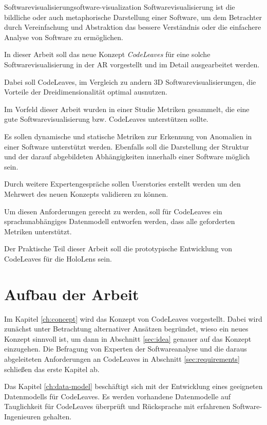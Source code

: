 \begin{defbox}{Softwarevisualisierung}{software-visualization}
Softwarevisualisierung ist die bildliche oder auch metaphorische Darstellung einer Software, um dem Betrachter durch Vereinfachung und Abstraktion das bessere Verständnis oder die einfachere Analyse von Software zu ermöglichen.
\end{defbox}

In dieser Arbeit soll das neue Konzept \emph{CodeLeaves} für eine solche Softwarevisualisierung in der AR vorgestellt und im Detail ausgearbeitet werden.

Dabei soll CodeLeaves, im Vergleich zu andern 3D Softwarevisualisierungen, die Vorteile der Dreidimensionalität optimal ausnutzen.

Im Vorfeld dieser Arbeit wurden in einer Studie Metriken gesammelt, die eine gute Softwarevisualisierung bzw. CodeLeaves unterstützen sollte.

Es sollen dynamische und statische Metriken zur Erkennung von Anomalien in einer Software unterstützt werden. Ebenfalls soll die Darstellung der Struktur und der darauf abgebildeten Abhängigkeiten innerhalb einer Software möglich sein.

Durch weitere Expertengespräche sollen Userstories erstellt werden um den Mehrwert des neuen Konzepts validieren zu können.

Um diesen Anforderungen gerecht zu werden, soll für CodeLeaves ein sprachunabhängiges Datenmodell entworfen werden, dass alle geforderten Metriken unterstützt.

Der Praktische Teil dieser Arbeit soll die prototypische Entwicklung von CodeLeaves für die HoloLens sein.

\section{Aufbau der Arbeit}
Im Kapitel \ref{ch:concept} wird das Konzept von CodeLeaves vorgestellt. Dabei wird zunächst unter Betrachtung alternativer Ansätzen begründet, wieso ein neues Konzept sinnvoll ist, um dann in Abschnitt \ref{sec:idea} genauer auf das Konzept einzugehen. Die Befragung von Experten der Softwareanalyse und die daraus abgeleiteten Anforderungen an CodeLeaves in Abschnitt \ref{sec:requirements} schließen das erste Kapitel ab.

Das Kapitel \ref{ch:data-model} beschäftigt sich mit der Entwicklung eines geeigneten Datenmodells für CodeLeaves. Es werden vorhandene Datenmodelle auf Tauglichkeit für CodeLeaves überprüft und Rücksprache mit erfahrenen Software-Ingenieuren gehalten.

